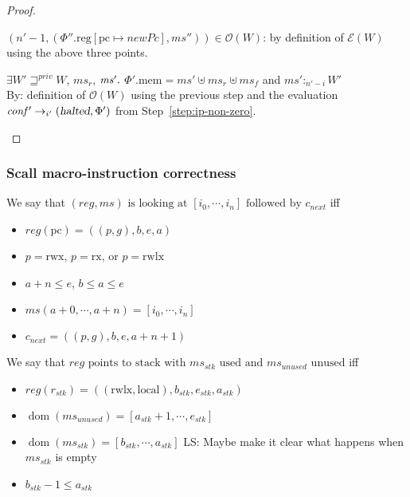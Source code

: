 \documentclass[a4paper]{article}
\newcommand{\update}[2]{[#1 \mapsto #2]}
\DeclareMathOperator{\dom}{dom}
\newcommand\lau[1]{{\color{purple} \sf \footnotesize {LS: #1}}\\}
\newcommand{\var}[1]{\mathit{#1}}
\newcommand{\hs}{\var{ms}}
\newcommand{\ms}{\hs}
\newcommand{\pcreg}{\mathrm{pc}}
\newcommand{\reg}{\var{reg}}
\newcommand{\heap}{\var{mem}}
\newcommand{\stk}{\var{stk}}
\newcommand{\plainproj}[1]{\mathrm{#1}}
\newcommand{\memheap}[1][\Phi]{#1.\plainproj{mem}}
\newcommand{\memreg}[1][\Phi]{#1.\plainproj{reg}}
\newcommand{\halted}{\textsl{halted}}
\newcommand{\futurestr}{\mathbin{\sqsupseteq}^{\var{priv}}}
\newcommand{\heapSat}[3][\heap]{#1 :_{#2} #3}
\newcommand{\asmType}{\plaindom{AsmType}}
\newcommand{\plaindom}[1]{\mathrm{#1}}
\newcommand{\intr}[2]{\mathcal{#1}}
\newcommand{\exprintr}[1]{\intr{E}{#1}}
\newcommand{\stder}{\exprintr{\asmType}}
\newcommand{\observations}{\mathcal{O}}
\newcommand{\npair}[2][n]{\left(#1,#2 \right)}
\newcommand{\plainperm}[1]{\mathrm{#1}}
\newcommand{\exec}{\plainperm{rx}}
\newcommand{\rwx}{\plainperm{rwx}}
\newcommand{\rwlx}{\plainperm{rwlx}}
\newcommand{\local}{\plainperm{local}}
\newcommand{\step}[1][]{\rightarrow_{#1}}
\begin{document}
\begin{proof}
\begin{enumproof}
\begin{enumproof}
      $\npair[n'-1]{(\memreg[\Phi'']\update{\pcreg}{\var{newPc}},\ms'')}\in\observations(W)$:
      by definition of $\stder(W)$ using the above three points.
    \item $\exists W' \futurestr W$, $\hs_r$, $\hs' \ldotp$
      $\memheap[\Phi'] = \hs' \uplus \hs_r \uplus \ms_f$ and $\heapSat[\hs']{n'-i}{W'}$\\
      By: definition of $\observations(W)$ using the previous step and the
      evaluation $\var{conf'}\step[i'] (\halted,\Phi')$ from
      Step~\ref{step:ip-non-zero}.
    \end{enumproof}
  \end{enumproof}
\end{proof}

\subsubsection{Scall macro-instruction correctness}
\begin{definition}
  We say that $(\reg,\ms) \text{ is looking at } [i_0,\cdots,i_n] \text{ followed by } c_{\mathit{next}}$ 
  iff
  \begin{itemize}
  \item $\reg(\pcreg) = ((p,g),b,e,a)$
  \item $p = \rwx$, $p = \exec$, or $p = \rwlx$
  \item $a+n\leq e$, $b\leq a\leq e$
  \item $\ms(a+0,\cdots,a+n) = [i_0,\cdots,i_n]$
  \item $c_{\mathit{next}} = ((p,g),b,e,a+n+1)$
  \end{itemize}
\end{definition}

\begin{definition}
  We say that $\reg \text{ points to stack with $\ms_\stk$ used and $\ms_{\mathit{unused}}$ unused}$
  iff
  \begin{itemize}
  \item $\reg(r_\stk) =((\rwlx,\local),b_\stk,e_\stk,a_\stk)$
  \item $\dom(\ms_{\mathit{unused}}) = [a_\stk+1,\cdots,e_\stk]$
  \item $\dom(\ms_\stk) = [b_\stk,\cdots,a_\stk]$ \lau{Maybe make it clear what happens when $\ms_\stk$ is empty}
  \item $b_\stk - 1\leq a_\stk$
  \end{itemize}
\end{definition}
\end{document}
